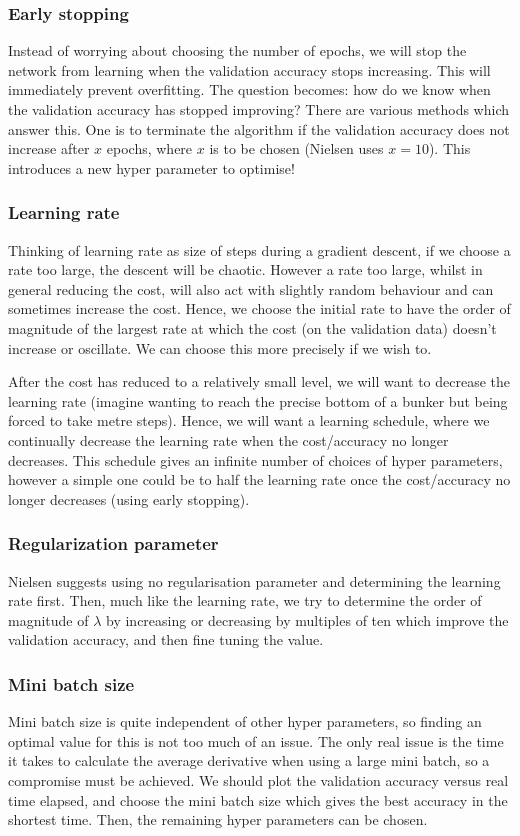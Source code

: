 \documentclass[10pt]{article}
\begin{document}
\subsubsection{Early stopping}
Instead of worrying about choosing the number of epochs, we will stop the network from learning when the validation accuracy stops increasing. This will immediately prevent overfitting. The question becomes: how do we know when the validation accuracy has stopped improving? There are various methods which answer this. One is to terminate the algorithm if the validation accuracy does not increase after $x$ epochs, where $x$ is to be chosen (Nielsen uses $x=10$). This introduces a new hyper parameter to optimise!

\subsubsection{Learning rate}
Thinking of learning rate as size of steps during a gradient descent, if we choose a rate too large, the descent will be chaotic. However a rate too large, whilst in general reducing the cost, will also act with slightly random behaviour and can sometimes increase the cost. Hence, we choose the initial rate to have the order of magnitude of the largest rate at which the cost (on the validation data) doesn't increase or oscillate. We can choose this more precisely if we wish to. \par
After the cost has reduced to a relatively small level, we will want to decrease the learning rate (imagine wanting to reach the precise bottom of a bunker but being forced to take metre steps). Hence, we will want a learning schedule, where we continually decrease the learning rate when the cost/accuracy no longer decreases. This schedule gives an infinite number of choices of hyper parameters, however a simple one could be to half the learning rate once the cost/accuracy no longer decreases (using early stopping).

\subsubsection{Regularization parameter}
Nielsen suggests using no regularisation parameter and determining the learning rate first. Then, much like the learning rate, we try to determine the order of magnitude of $\lambda$ by increasing or decreasing by multiples of ten which improve the validation accuracy, and then fine tuning the value.

\subsubsection{Mini batch size}
Mini batch size is quite independent of other hyper parameters, so finding an optimal value for this is not too much of an issue. The only real issue is the time it takes to calculate the average derivative when using a large mini batch, so a compromise must be achieved. We should plot the validation accuracy versus real time elapsed, and choose the mini batch size which gives the best accuracy in the shortest time. Then, the remaining hyper parameters can be chosen.
\end{document}
